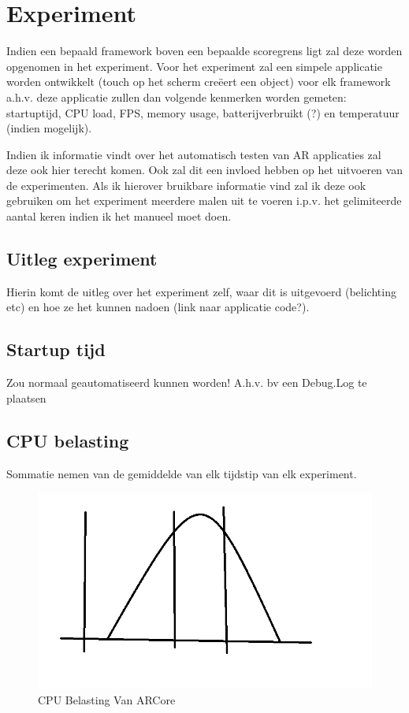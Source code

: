 \chapter{Experiment}
\label{ch:experiment}

Indien een bepaald framework boven een bepaalde scoregrens ligt zal deze worden opgenomen in het experiment.
Voor het experiment zal een simpele applicatie worden ontwikkelt (touch op het scherm creëert een object) voor elk framework a.h.v. deze applicatie zullen dan volgende kenmerken worden gemeten: startuptijd, CPU load, FPS, memory usage, batterijverbruikt (?) en temperatuur (indien mogelijk).

Indien ik informatie vindt over het automatisch testen van AR applicaties zal deze ook hier terecht komen. Ook zal dit een invloed hebben op het uitvoeren van de experimenten. Als ik hierover bruikbare informatie vind zal ik deze ook gebruiken om het experiment meerdere malen uit te voeren i.p.v. het gelimiteerde aantal keren indien ik het manueel moet doen.

\section{Uitleg experiment}
Hierin komt de uitleg over het experiment zelf, waar dit is uitgevoerd (belichting etc) en hoe ze het kunnen nadoen (link naar applicatie code?).

\section{Startup tijd}
Zou normaal geautomatiseerd kunnen worden! A.h.v. bv een Debug.Log te plaatsen
\section{CPU belasting}
Sommatie nemen van de gemiddelde van elk tijdstip van elk experiment.
\begin{figure}
    \includegraphics[width=\textwidth]{img/normaleverdeling}\caption{CPU Belasting Van ARCore}\label{fig:cpu1}
\end{figure}
